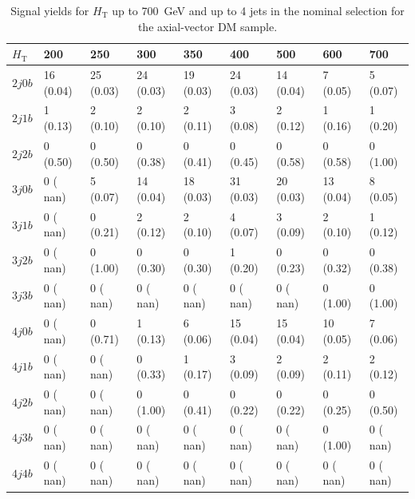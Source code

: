 \begin{table}[h]
\small
\begin{tabular}{lllllllll}
\hline \hline
$H_\textrm{T}$                 &     200 &            250 &             300&             350&             400&             500&             600&             700  \\\hline\hline
$2j 0b$&          16 (0.04)&	   25 (0.03)&	   24 (0.03)&	   19 (0.03)&	   24 (0.03)&	   14 (0.04)&	    7 (0.05)&	    5 (0.07) \\\hline
$2j 1b$&           1 (0.13)&	    2 (0.10)&	    2 (0.10)&	    2 (0.11)&	    3 (0.08)&	    2 (0.12)&	    1 (0.16)&	    1 (0.20) \\\hline
$2j 2b$&           0 (0.50)&	    0 (0.50)&	    0 (0.38)&	    0 (0.41)&	    0 (0.45)&	    0 (0.58)&	    0 (0.58)&	    0 (1.00) \\\hline
$3j 0b$&           0 ( nan)&	    5 (0.07)&	   14 (0.04)&	   18 (0.03)&	   31 (0.03)&	   20 (0.03)&	   13 (0.04)&	    8 (0.05) \\\hline
$3j 1b$&           0 ( nan)&	    0 (0.21)&	    2 (0.12)&	    2 (0.10)&	    4 (0.07)&	    3 (0.09)&	    2 (0.10)&	    1 (0.12) \\\hline
$3j 2b$&           0 ( nan)&	    0 (1.00)&	    0 (0.30)&	    0 (0.30)&	    1 (0.20)&	    0 (0.23)&	    0 (0.32)&	    0 (0.38) \\\hline
$3j 3b$&           0 ( nan)&	    0 ( nan)&	    0 ( nan)&	    0 ( nan)&	    0 ( nan)&	    0 ( nan)&	    0 (1.00)&	    0 (1.00) \\\hline
$4j 0b$&           0 ( nan)&	    0 (0.71)&	    1 (0.13)&	    6 (0.06)&	   15 (0.04)&	   15 (0.04)&	   10 (0.05)&	    7 (0.06) \\\hline
$4j 1b$&           0 ( nan)&	    0 ( nan)&	    0 (0.33)&	    1 (0.17)&	    3 (0.09)&	    2 (0.09)&	    2 (0.11)&	    2 (0.12) \\\hline
$4j 2b$&           0 ( nan)&	    0 ( nan)&	    0 (1.00)&	    0 (0.41)&	    0 (0.22)&	    0 (0.22)&	    0 (0.25)&	    0 (0.50) \\\hline
$4j 3b$&           0 ( nan)&	    0 ( nan)&	    0 ( nan)&	    0 ( nan)&	    0 ( nan)&	    0 ( nan)&	    0 (1.00)&	    0 ( nan) \\\hline
$4j 4b$&           0 ( nan)&	    0 ( nan)&	    0 ( nan)&	    0 ( nan)&	    0 ( nan)&	    0 ( nan)&	    0 ( nan)&	    0 ( nan) \\\hline
\hline
\end{tabular}
\caption{Signal yields for $H_\textrm{T}$ up to 700~GeV and up to 4 jets in the nominal selection for the axial-vector DM sample.}
\label{tab:sig_yields_AVDM_nom}
\end{table}

